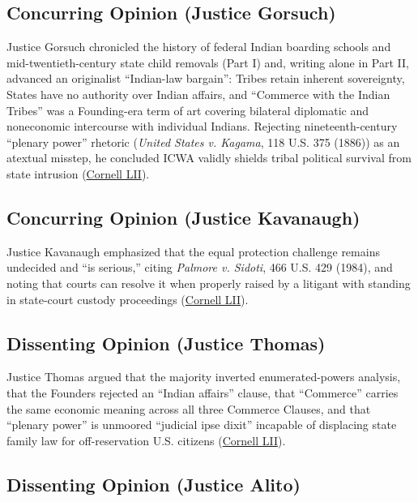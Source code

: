 \documentclass[12pt]{article}
\begin{document}
\subsection{Concurring Opinion (Justice Gorsuch)}

Justice Gorsuch chronicled the history of federal Indian boarding schools and mid-twentieth-century state child removals (Part I) and, writing alone in Part II, advanced an originalist ``Indian-law bargain'': Tribes retain inherent sovereignty, States have no authority over Indian affairs, and ``Commerce with the Indian Tribes'' was a Founding-era term of art covering bilateral diplomatic and noneconomic intercourse with individual Indians. Rejecting nineteenth-century ``plenary power'' rhetoric (\textit{United States v. Kagama}, 118 U.S. 375 (1886)) as an atextual misstep, he concluded ICWA validly shields tribal political survival from state intrusion (\href{https://www.law.cornell.edu/supremecourt/text/21-376}{Cornell LII}).

\subsection{Concurring Opinion (Justice Kavanaugh)}

Justice Kavanaugh emphasized that the equal protection challenge remains undecided and ``is serious,'' citing \textit{Palmore v. Sidoti}, 466 U.S. 429 (1984), and noting that courts can resolve it when properly raised by a litigant with standing in state-court custody proceedings (\href{https://www.law.cornell.edu/supremecourt/text/21-376}{Cornell LII}).

\subsection{Dissenting Opinion (Justice Thomas)}

Justice Thomas argued that the majority inverted enumerated-powers analysis, that the Founders rejected an ``Indian affairs'' clause, that ``Commerce'' carries the same economic meaning across all three Commerce Clauses, and that ``plenary power'' is unmoored ``judicial ipse dixit'' incapable of displacing state family law for off-reservation U.S. citizens (\href{https://www.law.cornell.edu/supremecourt/text/21-376}{Cornell LII}).

\subsection{Dissenting Opinion (Justice Alito)}
\end{document}
